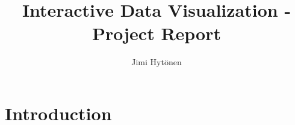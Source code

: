\documentclass[11pt]{article}
\title{Interactive Data Visualization - Project Report}
\author{
    Jimi Hytönen
}
\begin{document}
\maketitle

\section{Introduction}
\end{document}
